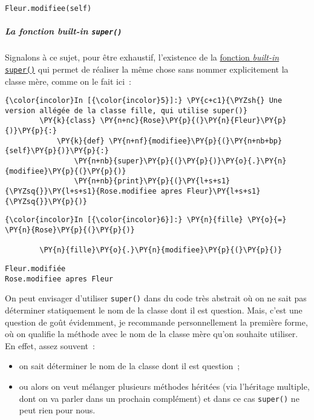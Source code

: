 \begin{verbatim}
Fleur.modifiee(self)
\end{verbatim}

    \hypertarget{la-fonction-built-in-super}{%
\subparagraph{\texorpdfstring{La fonction \emph{built-in}
\texttt{super()}}{La fonction built-in super()}}\label{la-fonction-built-in-super}}

    Signalons à ce sujet, pour être exhaustif, l'existence de la
\href{https://docs.python.org/3/library/functions.html\#super}{fonction
\emph{built-in} \texttt{super()}} qui permet de réaliser la même chose
sans nommer explicitement la classe mère, comme on le fait ici~:

    \begin{Verbatim}[commandchars=\\\{\}]
{\color{incolor}In [{\color{incolor}5}]:} \PY{c+c1}{\PYZsh{} Une version allégée de la classe fille, qui utilise super()}
        \PY{k}{class} \PY{n+nc}{Rose}\PY{p}{(}\PY{n}{Fleur}\PY{p}{)}\PY{p}{:}
            \PY{k}{def} \PY{n+nf}{modifiee}\PY{p}{(}\PY{n+nb+bp}{self}\PY{p}{)}\PY{p}{:}
                \PY{n+nb}{super}\PY{p}{(}\PY{p}{)}\PY{o}{.}\PY{n}{modifiee}\PY{p}{(}\PY{p}{)}
                \PY{n+nb}{print}\PY{p}{(}\PY{l+s+s1}{\PYZsq{}}\PY{l+s+s1}{Rose.modifiee apres Fleur}\PY{l+s+s1}{\PYZsq{}}\PY{p}{)}
\end{Verbatim}


    \begin{Verbatim}[commandchars=\\\{\}]
{\color{incolor}In [{\color{incolor}6}]:} \PY{n}{fille} \PY{o}{=} \PY{n}{Rose}\PY{p}{(}\PY{p}{)}
        
        \PY{n}{fille}\PY{o}{.}\PY{n}{modifiee}\PY{p}{(}\PY{p}{)}
\end{Verbatim}


    \begin{Verbatim}[commandchars=\\\{\}]
Fleur.modifiée
Rose.modifiee apres Fleur

    \end{Verbatim}

    On peut envisager d'utiliser \texttt{super()} dans du code très abstrait
où on ne sait pas déterminer statiquement le nom de la classe dont il
est question. Mais, c'est une question de goût évidemment, je recommande
personnellement la première forme, où on qualifie la méthode avec le nom
de la classe mère qu'on souhaite utiliser. En effet, assez souvent~:

\begin{itemize}
\tightlist
\item
  on sait déterminer le nom de la classe dont il est question~;
\item
  ou alors on veut mélanger plusieurs méthodes héritées (via l'héritage
  multiple, dont on va parler dans un prochain complément) et dans ce
  cas \texttt{super()} ne peut rien pour nous.
\end{itemize}

